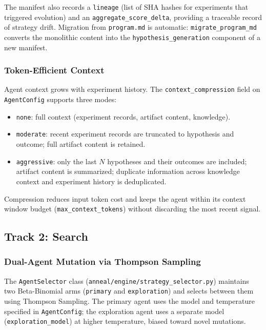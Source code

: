 The manifest also records a \texttt{lineage} (list of SHA hashes for experiments that triggered evolution) and an \texttt{aggregate\_score\_delta}, providing a traceable record of strategy drift.
Migration from \texttt{program.md} is automatic: \texttt{migrate\_program\_md} converts the monolithic content into the \texttt{hypothesis\_generation} component of a new manifest.

\subsubsection{Token-Efficient Context}\label{sec:context-compression}

Agent context grows with experiment history.
The \texttt{context\_compression} field on \texttt{AgentConfig} supports three modes:
\begin{itemize}
    \item \texttt{none}: full context (experiment records, artifact content, knowledge).
    \item \texttt{moderate}: recent experiment records are truncated to hypothesis and outcome; full artifact content is retained.
    \item \texttt{aggressive}: only the last $N$ hypotheses and their outcomes are included; artifact content is summarized; duplicate information across knowledge context and experiment history is deduplicated.
\end{itemize}
Compression reduces input token cost and keeps the agent within its context window budget (\texttt{max\_context\_tokens}) without discarding the most recent signal.

\subsection{Track 2: Search}\label{sec:track-search}

\subsubsection{Dual-Agent Mutation via Thompson Sampling}\label{sec:dual-agent}

The \texttt{Agent\allowbreak{}Selector} class (\texttt{anneal/\allowbreak{}engine/\allowbreak{}strategy\allowbreak{}\_selector.py}) maintains two Beta-Binomial arms (\texttt{primary} and \texttt{exploration}) and selects between them using Thompson Sampling.
The primary agent uses the model and temperature specified in \texttt{Agent\allowbreak{}Config}; the exploration agent uses a separate model (\texttt{exploration\allowbreak{}\_model}) at higher temperature, biased toward novel mutations.

